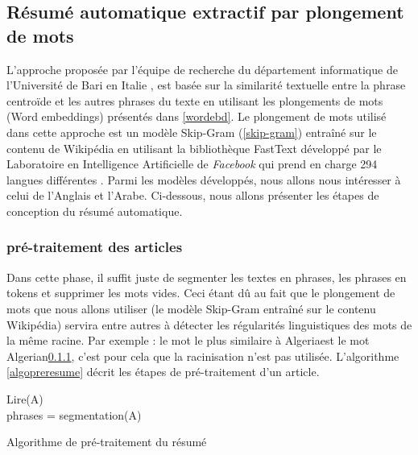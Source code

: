     \subsection{Résumé automatique extractif par plongement de mots}
    L'approche proposée par l'équipe de recherche du département informatique de l'Université de Bari en Italie \cite{notreresume}, est basée sur la similarité textuelle entre la phrase centroïde et les autres phrases du texte en utilisant les plongements de mots (Word embeddings) présentés dans \autoref{wordebd}. Le plongement de mots utilisé dans cette approche est un modèle Skip-Gram (\autoref{skip-gram}) entraîné sur le contenu de Wikipédia en utilisant la bibliothèque FastText développé par le Laboratoire en Intelligence Artificielle de \emph{Facebook} qui prend en charge 294 langues différentes \cite{fasttext}. Parmi les modèles développés, nous allons nous intéresser à celui de l'Anglais et l'Arabe. Ci-dessous, nous allons présenter les étapes de conception du résumé automatique.

        \subsubsection{pré-traitement des articles}
        Dans cette phase, il suffit juste de segmenter les textes en phrases, les phrases en tokens et supprimer les mots vides. Ceci étant dû au fait que le plongement de mots que nous allons utiliser (le modèle Skip-Gram entraîné sur le contenu Wikipédia) servira entre autres à détecter les régularités linguistiques des  mots de la même racine. Par exemple : le mot le plus similaire à \textquotedbl Algeria\textquotedbl est le mot \textquotedbl Algerian\textquotedbl \ref{}, c'est pour cela que la racinisation n'est pas utilisée. L'algorithme \autoref{algopreresume} décrit les étapes de pré-traitement d'un article.

         \begin{algorithm2e}[H]
          \label{algopreresume}
          \SetAlgoLined
          Lire(A)\\
          phrases = segmentation(A)\\
         \caption{Algorithme de pré-traitement du résumé}
        \end{algorithm2e}

